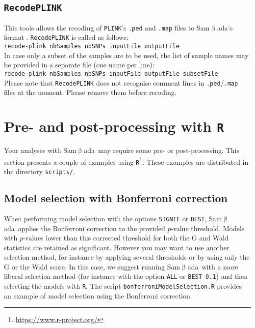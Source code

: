 \documentclass[a4paper,11pt]{article}
\newcommand{\smb}{\textsf{Sam$\upbeta$ada}}
\newcommand{\prog}[1]{\texttt{#1}}
\begin{document}
\subsection{\prog{RecodePLINK}}
This tools allows the recoding of \prog{PLINK}'s \prog{.ped} and \prog{.map} files to \smb's format \parencite[see][for further information on this format]{purcell:2009}.
\prog{RecodePLINK} is called as follows:\\
\verb+recode-plink nbSamples nbSNPs inputFile outputFile+\\
In case only a subset of the samples are to be used, the list of sample names may be provided in a separate file (one name per line):\\
\verb+recode-plink nbSamples nbSNPs inputFile outputFile subsetFile+\\
Please note that \prog{RecodePLINK} does not recognise comment lines in \prog{.ped}/\prog{.map} files at the moment. 
Please remove them before recoding.

\section{Pre- and post-processing with \prog{R}}

Your analyses with \smb\ may require some pre- or post-processing.
This section presents a couple of examples using \prog{R}\footnote{\url{https://www.r-project.org/}}.
These examples are distributed in the directory \prog{scripts/}.

\subsection*{Model selection with Bonferroni correction}

When performing model selection with the options \prog{SIGNIF} or \prog{BEST}, \smb\ applies the Bonferroni correction to the provided $p$-value threshold.
Models with $p$-values lower than this corrected threshold for both the G and Wald statistics are retained as significant.
However you may want to use another selection method, for instance by applying several thresholds or by using only the G or the Wald score.
In this case, we suggest running \smb\ with a more liberal selection method (for instance with the option \prog{ALL} or \prog{BEST 0.1}) and then selecting the models with \prog{R}.
The script \prog{bonferroniModelSelection.R} provides an example of model selection using the Bonferroni correction.

\clearpage
\end{document}
